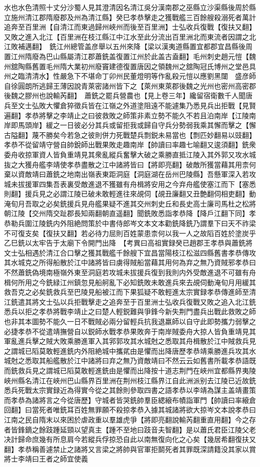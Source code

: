 水也水色清照十丈分沙蜀人見其澄清因名清江吳分漢南郡之巫縣立沙渠縣後周於縣立施州清江郡隋廢郡及州為清江縣】癸巳孝恭擊走之獲戰艦三百餘艘殺溺死者萬計追奔至百里洲【自清江而東過歸州峽州而後至百里洲】士弘收兵復戰【復扶又翻】又敗之進入北江【百里洲在枝江縣江中江水至此分流出百里洲北而東流者因謂之北江敗補邁翻】　銑江州總管盖彦舉以五州來降【梁以漢夷道縣置宜都郡宜昌縣後周置江州隋廢為巴山縣屬清江郡蕭銑盖復置江州於此盖古盍翻】毛州刺史趙元愷【魏州舘陶縣舊置毛州隋大業初州廢竇建德復置唐因之領魏州之舘陶冠氏博州之堂邑具州之臨清清水】性嚴急下不堪命丁卯州民董燈明等作亂殺元愷以應劉黑闥　盛彦師自徐圓朗所逃歸王薄因說青萊密諸州皆下之【萊州東萊郡後魏之光州也密州高密郡後魏之膠州也說輸芮翻】　蕭銑之罷兵營農也【見上卷三年】纔留宿衛數千人聞唐兵至文士弘敗大懼倉猝徵兵皆在江嶺之外道塗阻遠不能遽集乃悉見兵出拒戰【見賢遍翻】孝恭將擊之李靖止之曰彼救敗之師策非素立勢不能久不若且泊南岸【江陵南岸即馬頭岸】緩之一日彼必分其兵或留拒我或歸自守兵分勢弱我乘其懈而擊之【懈古隘翻】蔑不勝矣今若急之彼則併力死戰楚兵剽鋭未易當也【剽匹妙翻易以豉翻】孝恭不從留靖守營自帥銳師出戰果敗走趣南岸【帥讀曰率趣七喻翻又逡須翻】銑衆委舟收掠軍資人皆負重靖見其衆亂縱兵奮擊大破之乘勝直抵江陵入其外郭又攻水城抜之大獲舟艦李靖使孝恭盡散之江中諸將皆曰【將即亮翻】破敵所獲當藉其用柰何棄以資敵靖曰蕭銑之地南出嶺表東距洞庭【洞庭湖在岳州巴陵縣】吾懸軍深入若攻城未拔援軍四集吾表裏受敵進退不獲雖有舟楫將安用之今弃舟艦使塞江而下【塞悉則翻】援兵見之必謂江陵已破未敢輕進往來覘伺【覘丑廉翻又丑艶翻伺相吏翻】動淹旬月吾取之必矣銑援兵見舟艦果疑不進其交州刺史丘和長史高士廉司馬杜之松將朝江陵【交州隋交趾郡長知兩翻朝直遥翻】聞銑敗悉詣孝恭降【降戶江翻下同】孝恭勒兵圍江陵銑内外阻絶問策於中書侍郎岑文本文本勸銑降銑乃謂羣下曰天不祚梁不可復支矣【復扶又翻】若必待力屈則百姓蒙患柰何以我一人之故䧟百姓於塗炭乎乙巳銑以太牢告于太廟下令開門出降　【考異曰高祖實録癸已趙郡王孝恭與蕭銑將文士弘相遇於清江合口擊之獲其戰艦千餘艘下宜昌當陽枝江松滋四縣舊書孝恭傳攻其水城克之所得船散於江中諸將皆曰虜得賊船當藉其用何為弃之無乃資賊邪孝恭曰不然蕭銑偽境南極嶺外東至洞庭若攻城未拔援兵復到我則内外受敵進退不可雖有舟楫何所用之今銑緑江州鎮忽見船舸亂下必知銑敗未敢進兵來去覘伺動淹旬月用緩其救吾克之必矣銑救兵至巴陵見船被江而下果狐疑不敢輕進太宗實録孝恭傳進師至清江銑遣其將文士弘以兵拒戰擊走之追奔至于百里洲士弘收兵復戰又敗之追入北江銑悉兵以拒之孝恭將戰李靖止之曰楚人輕鋭難與爭鋒今新失荆門盡兵出戰此救敗之師也非其本圖勢不能久一日不戰賊必兩分留輕兵抗我退羸師以自守此即勢攜力弱擊之必捷孝恭不從遣靖撫營自以鋭師水戰孝恭果敗奔于南岸賊委舟大掠人皆負重靖見其軍亂進兵擊之賊大敗乘勝進軍入其郛郭攻其水城尅之悉取其舟楫散於江中賊救兵見之謂城已䧟莫敢輕進銑内外阻絶城中攜貮由是懼而出降唐歷孝恭靖乘勝進兵攻其水城尅之悉取其船艦散於江中諸將曰弃之無乃資敵靖曰不然云云如舊書所載孝恭語既而銑救兵見之謂城已䧟莫敢輕進銑由是懼而出降按十道志荆門在峽州宜都縣界夷陵峽州縣名清江在峽州巴山縣界百里洲在荆州枝江縣界江自此洲派别去江陵已近故銑悉兵死戰太宗實録近為得實今從之其餘則參取四書之語孝恭以李靖為謀主盖靖畫策而孝恭為諸將言之今從唐歷】守城者皆哭銑帥羣臣緦縗布幘詣軍門【帥讀曰率縗倉回翻】曰當死者唯銑耳百姓無罪願不殺掠孝恭入據其城諸將欲大掠岑文本說孝恭曰江南之民自隋末以來困於虐政重以羣雄虎爭【將即亮翻說輸芮翻重直用翻】今之存者皆鋒鏑之餘跂踵延頸以望真主【踵不至地曰跂音夫智翻】是以蕭氏君臣江陵父老决計歸命庶幾有所息肩今若縱兵俘掠恐自此以南無復向化之心矣【幾居希翻復扶又翻】孝恭稱善遽禁止之諸將又言梁之將帥與官軍拒鬬死者其罪既深請籍没其家以賞將士李靖曰王者之師宜使義